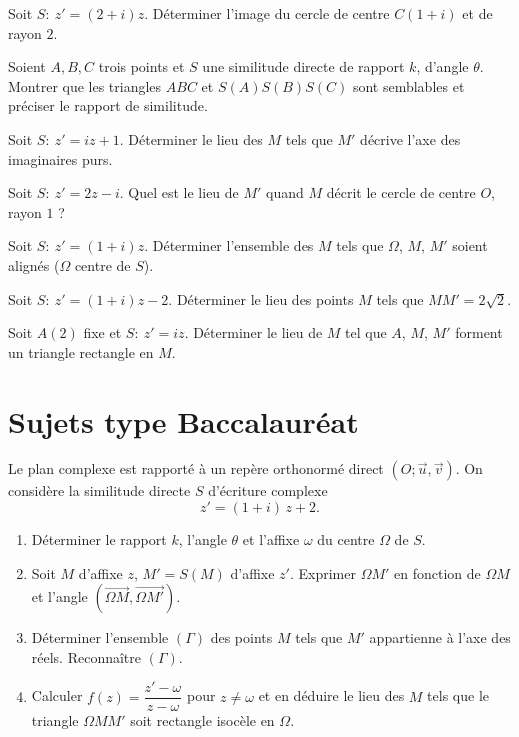 \exo{} Soit $S:\ z'=(2+i)z$. Déterminer l'image du cercle de centre $C(1+i)$ et de rayon $2$.

\exo{} Soient $A,B,C$ trois points et $S$ une similitude directe de rapport $k$, d'angle $\theta$.
Montrer que les triangles $ABC$ et $S(A)S(B)S(C)$ sont semblables et préciser le rapport de similitude.

\exo{} Soit $S:\ z'=iz+1$. Déterminer le lieu des $M$ tels que $M'$ décrive l'axe des imaginaires purs.

\exo{} Soit $S:\ z'=2z-i$. Quel est le lieu de $M'$ quand $M$ décrit le cercle de centre $O$, rayon $1$ ?

\exo{} Soit $S:\ z'=(1+i)z$. Déterminer l'ensemble des $M$ tels que $\Omega$, $M$, $M'$ soient alignés
($\Omega$ centre de $S$).

\exo{} Soit $S:\ z'=(1+i)z-2$. Déterminer le lieu des points $M$ tels que $MM'=2\sqrt2$.

\exo{} Soit $A(2)$ fixe et $S:\ z'=iz$. Déterminer le lieu de $M$ tel que $A$, $M$, $M'$ forment un
triangle rectangle en $M$.

\section{Sujets type Baccalauréat}

Le plan complexe est rapporté à un repère orthonormé direct $(O;\vec u,\vec v)$. On considère la
similitude directe $S$ d'écriture complexe
\[
z'=(1+i)\,z+2.
\]
\begin{enumerate}[label=\arabic*)]
\item Déterminer le rapport $k$, l'angle $\theta$ et l'affixe $\omega$ du centre $\Omega$ de $S$.
\item Soit $M$ d'affixe $z$, $M'=S(M)$ d'affixe $z'$. Exprimer $\Omega M'$ en fonction de $\Omega M$ et
l'angle $(\overrightarrow{\Omega M},\overrightarrow{\Omega M'})$.
\item Déterminer l'ensemble $(\Gamma)$ des points $M$ tels que $M'$ appartienne à l'axe des réels.
Reconnaître $(\Gamma)$.
\item Calculer $f(z)=\dfrac{z'-\omega}{z-\omega}$ pour $z\neq\omega$ et en déduire le lieu des $M$ tels que le
triangle $\Omega M M'$ soit rectangle isocèle en $\Omega$.
\end{enumerate}

